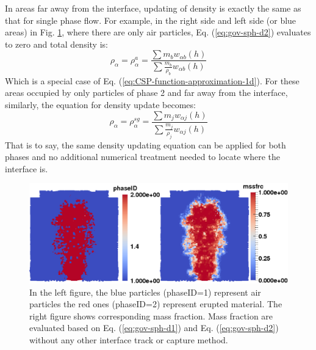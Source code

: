 \documentclass[gmd, manuscript]{copernicus}
\begin{document}
In areas far away from the interface, updating of density is exactly the same as that for single phase flow. For example, in the right side and left side (or blue areas) in Fig. \ref{fig:SPH-multiple-density}, where there are only air particles, Eq.  (\ref{eq:gov-sph-d2}) evaluates to zero and total density is:
\begin{equation}
\rho_{\alpha}=\rho_{\alpha}^a=\frac{\sum m_b w_{\alpha b} \left(h\right)}{\sum \frac{m_b}{\rho_b} w_{\alpha b} \left(h\right)}
\end{equation}
Which is a special case of Eq. (\ref{eq:CSP-function-approximation-1d}). For these areas occupied by only particles of phase 2 and far away from the interface, similarly, the equation for density update becomes: 
\begin{equation}
\rho_{\alpha}=\rho_{\alpha}^{sg}=\frac{\sum m_j w_{\alpha j} \left(h\right)}{\sum \frac{m_j}{\rho_j} w_{\alpha j} \left(h\right)}
\end{equation}
That is to say, the same density updating equation can be applied for both phases and no additional numerical treatment needed to locate where the interface is.

\begin{figure}
\includegraphics[width=12cm]{Fig1}
\caption{In the left figure, the blue particles (phaseID=1) represent air particles the red ones (phaseID=2) represent erupted material. The right figure shows corresponding mass fraction. Mass fraction are evaluated based on Eq. (\ref{eq:gov-sph-d1}) and Eq. (\ref{eq:gov-sph-d2}) without any other interface track or capture method.}
\label{fig:SPH-multiple-density}
\end{figure}
\end{document}
